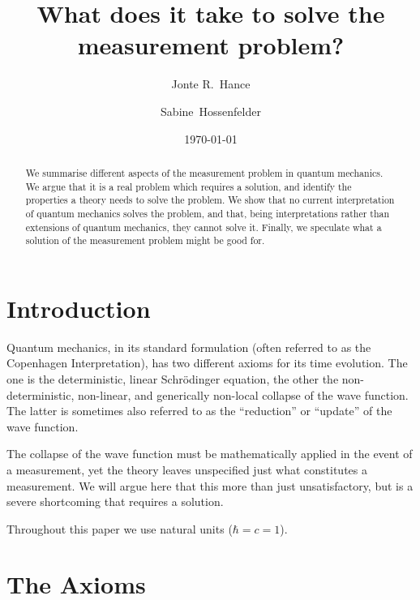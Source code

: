 \documentclass[superscriptaddress,floatfix,nofootinbib,12pt]{revtex4-2}
\begin{document}
\title{What does it take to solve the measurement problem?}
 
\author{Jonte R.\ Hance}
\author{Sabine\ Hossenfelder}
\date{\today}

\begin{abstract}
We summarise different aspects of the measurement problem in quantum mechanics. We argue that it is a real problem which requires a solution, and identify the properties a theory needs to solve the problem. We show that no current interpretation of quantum mechanics solves the problem, and that, being interpretations rather than extensions of quantum mechanics, they cannot solve it. Finally, we speculate  what a solution of the measurement problem might be good for.
\end{abstract}

\maketitle

\section{Introduction}

Quantum mechanics, in its standard formulation (often referred to as the Copenhagen Interpretation), has two different axioms for its time evolution. The one is the deterministic, linear Schr\"odinger equation, the other the non-deterministic, non-linear, and generically non-local collapse of the wave function. The latter is sometimes also referred to as the ``reduction'' or ``update'' of the wave function. 

The collapse of the wave function must be mathematically applied in the event of a measurement, yet the theory leaves unspecified just what constitutes a measurement. 
We will argue here that this more than just unsatisfactory, but is a severe shortcoming that requires a solution.

Throughout this paper we use natural units ($\hbar=c=1$). 


\section{The Axioms}
\label{sec:ax}
\end{document}
